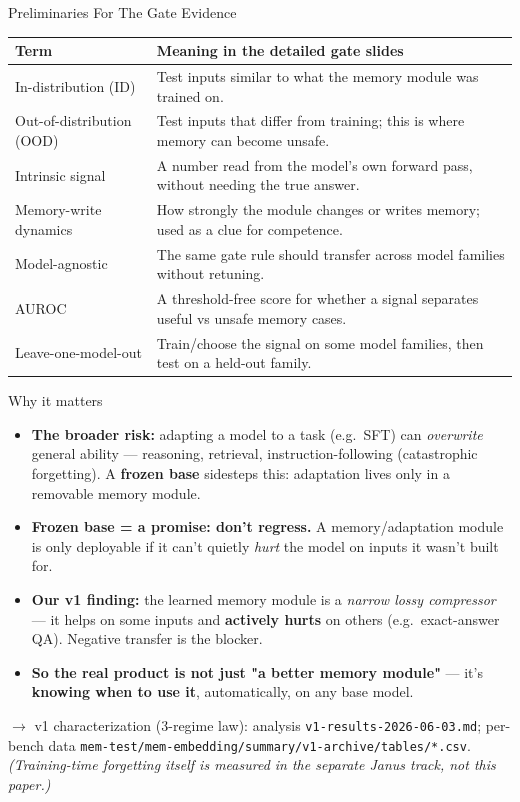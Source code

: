 \begin{frame}{Preliminaries For The Gate Evidence}
  \scriptsize
  \begin{tabular}{p{}p{}}
    \toprule
    Term & Meaning in the detailed gate slides \\
    \midrule
    In-distribution (ID) & Test inputs similar to what the memory module was trained on. \\
    Out-of-distribution (OOD) & Test inputs that differ from training; this is where memory can become unsafe. \\
    Intrinsic signal & A number read from the model's own forward pass, without needing the true answer. \\
    Memory-write dynamics & How strongly the module changes or writes memory; used as a clue for competence. \\
    Model-agnostic & The same gate rule should transfer across model families without retuning. \\
    AUROC & A threshold-free score for whether a signal separates useful vs unsafe memory cases. \\
    Leave-one-model-out & Train/choose the signal on some model families, then test on a held-out family. \\
    \bottomrule
  \end{tabular}
\end{frame}

\begin{frame}{Why it matters}
  \begin{itemize}
    \item \textbf{The broader risk:} adapting a model to a task (e.g.\ SFT) can \emph{overwrite} general ability --- reasoning, retrieval, instruction-following (catastrophic forgetting). A \textbf{frozen base} sidesteps this: adaptation lives only in a removable memory module.
    \item \textbf{Frozen base = a promise: don't regress.} A memory/adaptation module is only deployable if it can't quietly \emph{hurt} the model on inputs it wasn't built for.
    \item \textbf{Our v1 finding:} the learned memory module is a \emph{narrow lossy compressor} --- it helps on some inputs and \textbf{actively hurts} on others (e.g.\ exact-answer QA). Negative transfer is the blocker.
    \item \textbf{So the real product is not just "a better memory module"} --- it's \textbf{knowing when to use it}, automatically, on any base model.
  \end{itemize}
  \vspace{0.6em}
  \footnotesize $\rightarrow$ v1 characterization (3-regime law): analysis \texttt{v1-results-2026-06-03.md}; per-bench data \texttt{mem-test/mem-embedding/summary/v1-archive/tables/*.csv}. \emph{(Training-time forgetting itself is measured in the separate Janus track, not this paper.)}
\end{frame}

